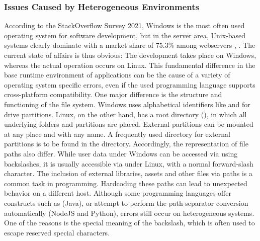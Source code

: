         \subsubsection{Issues Caused by Heterogeneous Environments}\label{sss::hetero}
        According to the StackOverflow Survey 2021, Windows is the most often used operating system for software development, but in the server area, Unix-based systems clearly dominate with a market share of 75.3\% among webservers \cite{stackoverflow2021}, \cite{unixusage}. The current state of affairs is thus obvious: The development takes place on Windows, whereas the actual operation occurs on Linux. This fundamental difference in the base runtime environment of applications can be the cause of a variety of operating system specific errors, even if the used programming language supports cross-platform compatibility. One major difference is the structure and functioning of the file system. Windows uses alphabetical identifiers like  and  for drive partitions. Linux, on the other hand, has a root directory (\code{/}), in which all underlying folders and partitions are placed. External partitions can be mounted at any place and with any name. A frequently used directory for external partitions is to be found in the  directory. Accordingly, the representation of file paths also differ. While user data under Windows can be accessed via  using backslashes, it is usually accessible via  under Linux, with a normal forward-slash character. The inclusion of external libraries, assets and other files via paths is a common task in programming. Hardcoding these paths can lead to unexpected behavior on a different host. Although some programming languages offer constructs such as  (Java), or attempt to perform the path-separator conversion automatically (NodeJS and Python), errors still occur on heterogeneous systems. One of the reasons is the special meaning of the backslash, which is often used to escape reserved special characters.\newline
